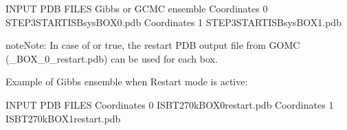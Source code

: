 \documentclass[letterpaper,10pt,english]{sphinxmanual}
\begin{document}
\begin{description}
\begin{sphinxVerbatim}[commandchars=\\\{\}]
\PYGZsh{}\PYGZsh{}\PYGZsh{}\PYGZsh{}\PYGZsh{}\PYGZsh{}\PYGZsh{}\PYGZsh{}\PYGZsh{}\PYGZsh{}\PYGZsh{}\PYGZsh{}\PYGZsh{}\PYGZsh{}\PYGZsh{}\PYGZsh{}\PYGZsh{}\PYGZsh{}\PYGZsh{}\PYGZsh{}\PYGZsh{}\PYGZsh{}\PYGZsh{}\PYGZsh{}\PYGZsh{}\PYGZsh{}\PYGZsh{}\PYGZsh{}\PYGZsh{}\PYGZsh{}\PYGZsh{}\PYGZsh{}\PYGZsh{}\PYGZsh{}\PYGZsh{}\PYGZsh{}\PYGZsh{}\PYGZsh{}\PYGZsh{}\PYGZsh{}\PYGZsh{}\PYGZsh{}\PYGZsh{}\PYGZsh{}\PYGZsh{}
\PYGZsh{} INPUT PDB FILES \PYGZhy{} Gibbs or GCMC ensemble
\PYGZsh{}\PYGZsh{}\PYGZsh{}\PYGZsh{}\PYGZsh{}\PYGZsh{}\PYGZsh{}\PYGZsh{}\PYGZsh{}\PYGZsh{}\PYGZsh{}\PYGZsh{}\PYGZsh{}\PYGZsh{}\PYGZsh{}\PYGZsh{}\PYGZsh{}\PYGZsh{}\PYGZsh{}\PYGZsh{}\PYGZsh{}\PYGZsh{}\PYGZsh{}\PYGZsh{}\PYGZsh{}\PYGZsh{}\PYGZsh{}\PYGZsh{}\PYGZsh{}\PYGZsh{}\PYGZsh{}\PYGZsh{}\PYGZsh{}\PYGZsh{}\PYGZsh{}\PYGZsh{}\PYGZsh{}\PYGZsh{}\PYGZsh{}\PYGZsh{}\PYGZsh{}\PYGZsh{}\PYGZsh{}\PYGZsh{}\PYGZsh{}
Coordinates   0   STEP3\PYGZus{}START\PYGZus{}ISB\PYGZus{}sys\PYGZus{}BOX\PYGZus{}0.pdb
Coordinates   1   STEP3\PYGZus{}START\PYGZus{}ISB\PYGZus{}sys\PYGZus{}BOX\PYGZus{}1.pdb
\end{sphinxVerbatim}

\begin{sphinxadmonition}{note}{Note:}
In case of  or  true, the restart PDB output file from GOMC (\_BOX\_0\_restart.pdb) can be used for each box.
\end{sphinxadmonition}

Example of Gibbs ensemble when Restart mode is active:

\begin{sphinxVerbatim}[commandchars=\\\{\}]
\PYGZsh{}\PYGZsh{}\PYGZsh{}\PYGZsh{}\PYGZsh{}\PYGZsh{}\PYGZsh{}\PYGZsh{}\PYGZsh{}\PYGZsh{}\PYGZsh{}\PYGZsh{}\PYGZsh{}\PYGZsh{}\PYGZsh{}\PYGZsh{}\PYGZsh{}\PYGZsh{}\PYGZsh{}\PYGZsh{}\PYGZsh{}\PYGZsh{}\PYGZsh{}\PYGZsh{}\PYGZsh{}\PYGZsh{}\PYGZsh{}\PYGZsh{}\PYGZsh{}\PYGZsh{}\PYGZsh{}\PYGZsh{}\PYGZsh{}
\PYGZsh{} INPUT PDB FILES
\PYGZsh{}\PYGZsh{}\PYGZsh{}\PYGZsh{}\PYGZsh{}\PYGZsh{}\PYGZsh{}\PYGZsh{}\PYGZsh{}\PYGZsh{}\PYGZsh{}\PYGZsh{}\PYGZsh{}\PYGZsh{}\PYGZsh{}\PYGZsh{}\PYGZsh{}\PYGZsh{}\PYGZsh{}\PYGZsh{}\PYGZsh{}\PYGZsh{}\PYGZsh{}\PYGZsh{}\PYGZsh{}\PYGZsh{}\PYGZsh{}\PYGZsh{}\PYGZsh{}\PYGZsh{}\PYGZsh{}\PYGZsh{}\PYGZsh{}
Coordinates   0   ISB\PYGZus{}T\PYGZus{}270\PYGZus{}k\PYGZus{}BOX\PYGZus{}0\PYGZus{}restart.pdb
Coordinates   1   ISB\PYGZus{}T\PYGZus{}270\PYGZus{}k\PYGZus{}BOX\PYGZus{}1\PYGZus{}restart.pdb
\end{sphinxVerbatim}


\end{description}
\end{document}
